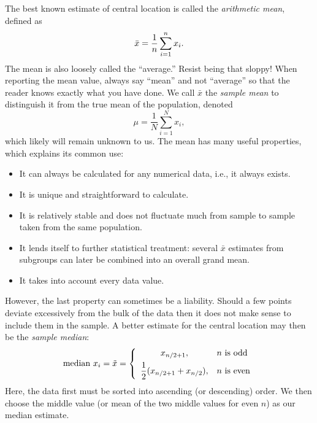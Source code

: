 	The best known estimate of central location is called the \emph{arithmetic mean}, defined as 
\begin{equation}
	\index{Sample!mean}
	\index{Mean}
	\index{Arithmetic mean}
\bar{x} = \frac{1}{n} \sum^n_{i=1} x_i.
\label{eq:arith_mean}
\end{equation}
The mean is also loosely called the ``average.''  Resist being that sloppy! When reporting the mean value, always say ``mean'' and 
not ``average'' so that the reader knows exactly what you have done.  We call $\bar{x}$  the \emph{sample mean} to 
distinguish it from the true mean of the population, denoted
\begin{equation}
\mu = \frac{1}{N} \sum^N_{i=1} x_i,
\end{equation}
which likely will remain unknown to us.  The mean has many useful properties, which explains its common use:
\begin{itemize}
\item	It can always be calculated for any numerical data, i.e., it always exists.
\item	It is unique and straightforward to calculate.
\item It is relatively stable and does not fluctuate much from sample to sample taken from the same 
population.
\item 	It lends itself to further statistical treatment:  several $\bar{x}$ estimates from subgroups can later be combined into an overall grand
mean.
\item	It takes into account every data value.
\end{itemize}
However, the last property can sometimes be a liability.  Should a few points deviate excessively 
from the bulk of the data then it does not make sense to include them in the sample.  A better 
estimate for the central location may then be the \emph{sample median}:
\begin{equation}
	\index{Sample!median}
	\index{Median}
\mbox{median } x_i = \tilde{x} = \left \{ \begin{array}{cl}
x_{ n/2 + 1}, & n \mbox{ is odd}\\*[1ex]
\displaystyle \frac{1}{2} (x_{n/2 + 1} + x_{n/2} ), & n \mbox{ is even}
\end{array} \right.
\end{equation}
Here, the data first must be sorted into ascending (or descending) order.  We then choose the middle 
value (or mean of the two middle values for even $n$) as our median estimate.

